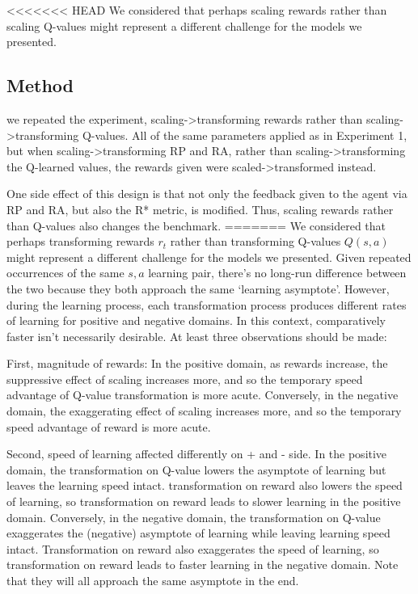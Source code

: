 
<<<<<<< HEAD
We considered that perhaps scaling rewards rather than scaling Q-values might represent a different challenge for the models we presented.

\subsection{Method}

we repeated the experiment, scaling->transforming rewards rather than scaling->transforming Q-values. All of the same parameters applied as in Experiment 1, but when scaling->transforming RP and RA, rather than scaling->transforming the Q-learned values, the rewards given were scaled->transformed instead.

One side effect of this design is that not only the feedback given to the agent via RP and RA, but also the R* metric, is modified. Thus, scaling rewards rather than Q-values also changes the benchmark.
=======
We considered that perhaps transforming rewards $r_t$ rather than transforming Q-values $Q(s, a)$ might represent a different challenge for the models we presented. Given repeated occurrences of the same $s, a$ learning pair, there's no long-run difference between the two because they both approach the same `learning asymptote'. However, during the learning process, each transformation process produces different rates of learning for positive and negative domains. In this context, comparatively faster isn't necessarily desirable. At least three observations should be made:

First, magnitude of rewards: In the positive domain, as rewards increase, the suppressive effect of scaling increases more, and so the temporary speed advantage of Q-value transformation is more acute. Conversely, in the negative domain, the exaggerating effect of scaling increases more, and so the temporary speed advantage of reward is more acute.

Second, speed of learning affected differently on + and - side. In the positive domain, the transformation on Q-value lowers the asymptote of learning but leaves the learning speed intact. transformation on reward also lowers the speed of learning, so transformation on reward leads to slower learning in the positive domain. Conversely, in the negative domain, the transformation on Q-value exaggerates the (negative) asymptote of learning while leaving learning speed intact. Transformation on reward also exaggerates the speed of learning, so transformation on reward leads to faster learning in the negative domain. Note that they will all approach the same asymptote in the end.

